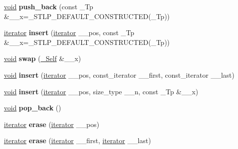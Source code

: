 \begin{DoxyCompactItemize}
\item 
\mbox{\label{structvector_a48eb86e8cc3d665aee8e9bfc242dfa84}} 
\hyperlink{interfacevoid}{void} {\bfseries push\+\_\+back} (const \+\_\+\+Tp \&\+\_\+\+\_\+x=\+\_\+\+S\+T\+L\+P\+\_\+\+D\+E\+F\+A\+U\+L\+T\+\_\+\+C\+O\+N\+S\+T\+R\+U\+C\+T\+ED(\+\_\+\+Tp))
\item 
\mbox{\label{structvector_a7444b2b0ba7f8713f5eab6428ca1c0ec}} 
\hyperlink{structiterator}{iterator} {\bfseries insert} (\hyperlink{structiterator}{iterator} \+\_\+\+\_\+pos, const \+\_\+\+Tp \&\+\_\+\+\_\+x=\+\_\+\+S\+T\+L\+P\+\_\+\+D\+E\+F\+A\+U\+L\+T\+\_\+\+C\+O\+N\+S\+T\+R\+U\+C\+T\+ED(\+\_\+\+Tp))
\item 
\mbox{\label{structvector_a954adb8b00a9f3c34e29db09b9b8b582}} 
\hyperlink{interfacevoid}{void} {\bfseries swap} (\hyperlink{structvector}{\+\_\+\+Self} \&\+\_\+\+\_\+x)
\item 
\mbox{\label{structvector_a25a4b9f8039c412c282a6ac6174c7b01}} 
\hyperlink{interfacevoid}{void} {\bfseries insert} (\hyperlink{structiterator}{iterator} \+\_\+\+\_\+pos, const\+\_\+iterator \+\_\+\+\_\+first, const\+\_\+iterator \+\_\+\+\_\+last)
\item 
\mbox{\label{structvector_a9527d106faa2895e8428cd660d45cd19}} 
\hyperlink{interfacevoid}{void} {\bfseries insert} (\hyperlink{structiterator}{iterator} \+\_\+\+\_\+pos, size\+\_\+type \+\_\+\+\_\+n, const \+\_\+\+Tp \&\+\_\+\+\_\+x)
\item 
\mbox{\label{structvector_a0b283d31b60efcb22635718006e37050}} 
\hyperlink{interfacevoid}{void} {\bfseries pop\+\_\+back} ()
\item 
\mbox{\label{structvector_a03451bcd692e6d29f636a2a3cc6396a5}} 
\hyperlink{structiterator}{iterator} {\bfseries erase} (\hyperlink{structiterator}{iterator} \+\_\+\+\_\+pos)
\item 
\mbox{\label{structvector_ac43a0f26f53b294f0648655224aac1d3}} 
\hyperlink{structiterator}{iterator} {\bfseries erase} (\hyperlink{structiterator}{iterator} \+\_\+\+\_\+first, \hyperlink{structiterator}{iterator} \+\_\+\+\_\+last)
\item 

\end{DoxyCompactItemize}
